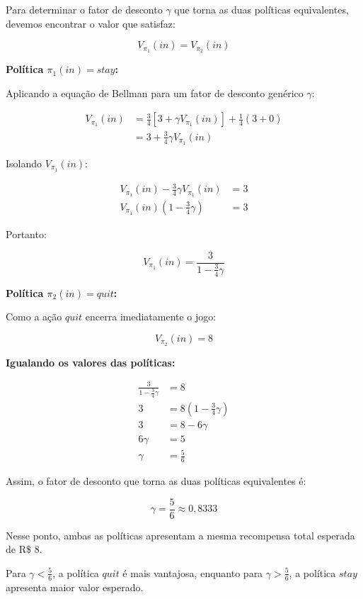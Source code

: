 Para determinar o fator de desconto $\gamma$
que torna as duas políticas equivalentes,
devemos encontrar o valor que satisfaz:

\[
    V_{\pi_1}(in) = V_{\pi_2}(in)
\]

\textbf{Política $\pi_1(in) = stay$:}

Aplicando a equação de Bellman para um
fator de desconto genérico $\gamma$:

\[
\begin{aligned}
    V_{\pi_1}(in)
    &= \frac{3}{4}
    \left[3 + \gamma V_{\pi_1}(in)\right]
    + \frac{1}{4}(3 + 0)
    \\[6pt]
    &= 3 + \frac{3}{4}\gamma V_{\pi_1}(in)
\end{aligned}
\]

Isolando $V_{\pi_1}(in)$:

\[
\begin{aligned}
    V_{\pi_1}(in)
    - \frac{3}{4}\gamma V_{\pi_1}(in) &= 3
    \\[6pt]
    V_{\pi_1}(in)
    \left(1-\frac{3}{4}\gamma\right) &= 3
\end{aligned}
\]

Portanto:

\[
    V_{\pi_1}(in) =
    \frac{3}{1-\frac{3}{4}\gamma}
\]

\textbf{Política $\pi_2(in) = quit$:}

Como a ação $quit$ encerra imediatamente o jogo:

\[
    V_{\pi_2}(in) = 8
\]

\textbf{Igualando os valores das políticas:}

\[
\begin{aligned}
    \frac{3}{1-\frac{3}{4}\gamma} &= 8
    \\[6pt]
    3 &= 8\left(1-\frac{3}{4}\gamma\right)
    \\[6pt]
    3 &= 8 - 6\gamma
    \\[6pt]
    6\gamma &= 5
    \\[6pt]
    \gamma &= \frac{5}{6}
\end{aligned}
\]

Assim, o fator de desconto que torna as
duas políticas equivalentes é:

\[
    \boxed{\gamma = \frac{5}{6} \approx 0{,}8333}
\]

Nesse ponto, ambas as políticas apresentam
a mesma recompensa total esperada de R\$ 8.

Para $\gamma < \frac{5}{6}$, a política $quit$
é mais vantajosa, enquanto para
$\gamma > \frac{5}{6}$, a política $stay$
apresenta maior valor esperado.

